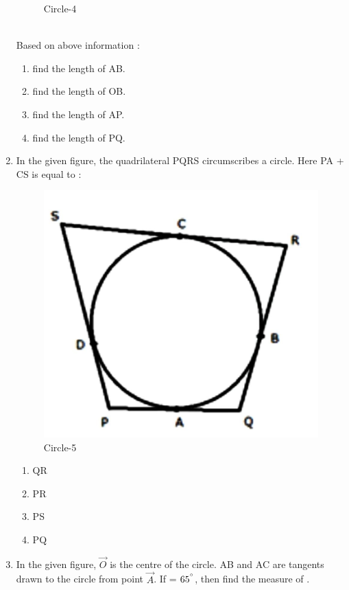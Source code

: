 \documentclass{article}
\begin{document}
\begin{enumerate}
\begin{figure}[h!]
			\caption{Circle-4}
			\label{fig:circle}
		\end{figure}\\
		Based on above information :
		\begin{enumerate}
			\item find the length of AB.
			\item find the length of OB.
			\item find the length of AP.
			\item find the length of PQ.
		\end{enumerate}
	\item In the given figure, the quadrilateral PQRS circumscribes a circle. Here PA + CS is equal to :
		\begin{figure}[h!]
			\centering
			\includegraphics[scale=0.155]{6.jpg}
			\caption{Circle-5}
			\label{fig:circle}
		\end{figure}
		\begin{enumerate}
			\item QR
			\item PR
			\item PS
			\item PQ
		\end{enumerate}
	\item In the given figure, $ \vec{O} $ is the centre of the circle. AB and AC are tangents drawn to the circle from point $ \vec{A} $. If  = $ 65^{\degree} $, then find the measure of .

\end{enumerate}
\end{document}
